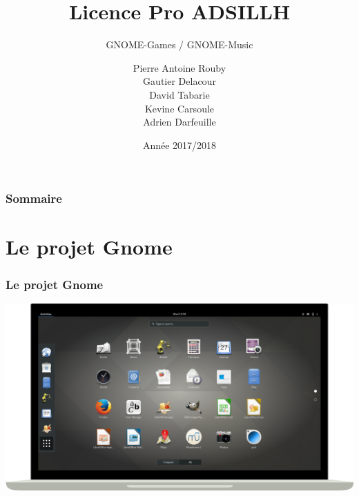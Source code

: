 \documentclass{beamer}
\title{Licence Pro ADSILLH}
\subtitle{GNOME-Games / GNOME-Music}
\author{Pierre Antoine Rouby\\Gautier Delacour\\
  David Tabarie\\Kevine Carsoule\\Adrien Darfeuille}
\date{Année 2017/2018}
\begin{document}
\frame{\titlepage}

\begin{frame}
  \frametitle{Sommaire}
  \tableofcontents
\end{frame}

\section{Le projet Gnome}
\begin{frame}
  \frametitle{Le projet Gnome}
  \includegraphics[scale=0.235]{images/GnomeScreen.png}
\end{frame}
\end{document}
